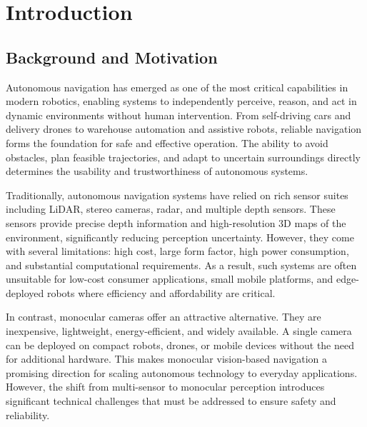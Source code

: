 \documentclass[12pt,oneside]{book}
\makeatletter
\renewcommand{\thefigure}{\Roman{figure}}
\renewcommand{\tablename}{TABLE}
\renewcommand{\thetable}{\Roman{table}}
\renewcommand{\fnum@table}{\tablename~\thetable}
\makeatother
\begin{document}
\listoffigures
\clearpage

\renewcommand{\listtablename}{LIST OF TABLES}
\renewcommand{\tablename}{TABLE}
\renewcommand{\thetable}{\Roman{table}}
\makeatletter
\renewcommand{\fnum@table}{\tablename~\thefigure}
\makeatother

\listoftables
\clearpage

\chapter{Introduction}

\let\oldsection\section
\renewcommand{\section}[1]{\oldsection*{#1}}

\section{Background and Motivation}
Autonomous navigation has emerged as one of the most critical capabilities in modern robotics, enabling systems to independently perceive, reason, and act in dynamic environments without human intervention. From self-driving cars and delivery drones to warehouse automation and assistive robots, reliable navigation forms the foundation for safe and effective operation. The ability to avoid obstacles, plan feasible trajectories, and adapt to uncertain surroundings directly determines the usability and trustworthiness of autonomous systems.

Traditionally, autonomous navigation systems have relied on rich sensor suites including LiDAR, stereo cameras, radar, and multiple depth sensors. These sensors provide precise depth information and high-resolution 3D maps of the environment, significantly reducing perception uncertainty. However, they come with several limitations: high cost, large form factor, high power consumption, and substantial computational requirements. As a result, such systems are often unsuitable for low-cost consumer applications, small mobile platforms, and edge-deployed robots where efficiency and affordability are critical.

In contrast, monocular cameras offer an attractive alternative. They are inexpensive, lightweight, energy-efficient, and widely available. A single camera can be deployed on compact robots, drones, or mobile devices without the need for additional hardware. This makes monocular vision-based navigation a promising direction for scaling autonomous technology to everyday applications. However, the shift from multi-sensor to monocular perception introduces significant technical challenges that must be addressed to ensure safety and reliability.
\end{document}
